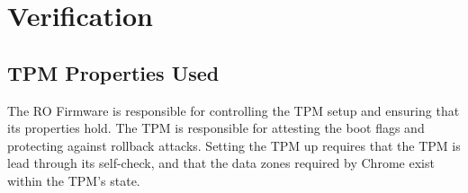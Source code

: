 \documentclass[../report.tex]{subfiles}
\begin{document}
\onehalfspacing


\section{Verification}

%
%

\subsection{TPM Properties Used}

The RO Firmware is responsible for controlling the TPM setup and ensuring that its properties hold. 
The TPM is responsible for attesting the boot flags and protecting against rollback attacks. 
Setting the TPM up requires that the TPM is lead through its self-check, and that the data zones required by Chrome exist within the TPM's state.
\end{document}
